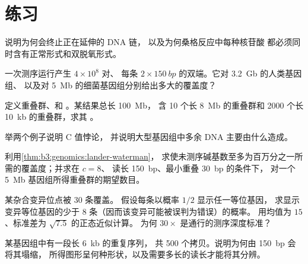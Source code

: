\section{练习}

\begin{exercise}[$\star$]\label{exo:b3:genomics:1}
说明为何会终止正在延伸的 DNA 链，
以及为何桑格反应中每种核苷酸
都必须同时含有正常形式和双脱氧形式。
\end{exercise}

\begin{exercise}[$\star$]\label{exo:b3:genomics:2}
一次测序运行产生 $4\times 10^{8}$ 对、
每条 $2\times \qty{150}{bp}$ 的双端。它对 \qty{3.2}{Gb} 的人类基因组、
以及对 \qty{5}{Mb} 的细菌基因组分别给出多大的覆盖度？
\end{exercise}

\begin{exercise}[$\star$]\label{exo:b3:genomics:3}
定义重叠群、和 。某结果总长 \qty{100}{Mb}，
含 10 个长 \qty{8}{Mb} 的重叠群和 \num{2000} 个长 \qty{10}{kb} 的重叠群，求其 。
\end{exercise}

\begin{exercise}[$\star$]\label{exo:b3:genomics:4}
举两个例子说明 C 值悖论，
并说明大型基因组中多余 DNA 主要由什么造成。
\end{exercise}

\begin{exercise}[$\star\star$]\label{exo:b3:genomics:5}
利用\cref{thm:b3:genomics:lander-waterman}，
求使未测序碱基数至多为百万分之一所需的覆盖度；并求在 $c = 8$、
读长 \qty{150}{bp}、最小重叠 \qty{30}{bp} 的条件下，
对一个 \qty{5}{Mb} 基因组所得重叠群的期望数目。
\end{exercise}

\begin{exercise}[$\star\star$]\label{exo:b3:genomics:6}
某杂合变异位点被 $30$ 条覆盖。
假设每条以概率 $1/2$ 显示任一等位基因，
求显示变异等位基因的少于 $8$ 条（因而该变异可能被误判为错误）的概率。
用均值为 $15$、标准差为 $\sqrt{7.5}$ 的正态近似计算。
为何 $30\times$ 是通行的测序深度标准？
\end{exercise}

\begin{exercise}[$\star\star$]\label{exo:b3:genomics:7}
某基因组中有一段长 \qty{6}{kb} 的重复序列，
共 \num{500} 个拷贝。说明为何由 \qty{150}{bp} 会将其塌缩，
所得图形呈何种形状，以及需要多长的读长才能将其分辨。
\end{exercise}

